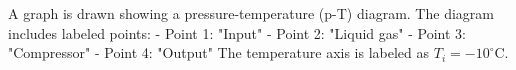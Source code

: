 A graph is drawn showing a pressure-temperature (p-T) diagram. The diagram includes labeled points:  
- Point 1: "Input"  
- Point 2: "Liquid gas"  
- Point 3: "Compressor"  
- Point 4: "Output"  
The temperature axis is labeled as \( T_i = -10^\circ \text{C} \).